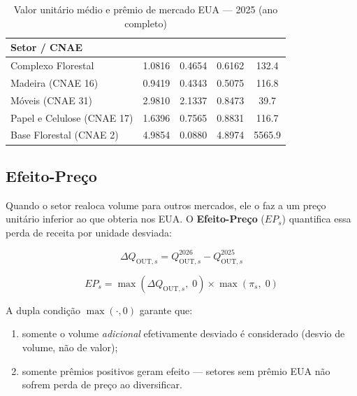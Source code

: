 \documentclass[12pt, a4paper]{article}
\begin{document}
\begin{table}[H]
  \centering
  \caption{Valor unitário médio e prêmio de mercado EUA — 2025 (ano completo)}
  \label{tab:vu}
  \renewcommand{\arraystretch}{1.3}
  \begin{tabular}{lS[table-format=1.4]S[table-format=1.4]S[table-format=1.4]S[table-format=4.1]}
    \toprule
    \textbf{Setor / CNAE}
      & \textbf{}
      & \textbf{}
      & \textbf{}
      & \textbf{} \\
    \midrule
    Complexo Florestal         & 1.0816 & 0.4654 & 0.6162 & 132.4 \\
    Madeira (CNAE 16)          & 0.9419 & 0.4343 & 0.5075 & 116.8 \\
    Móveis (CNAE 31)           & 2.9810 & 2.1337 & 0.8473 &  39.7 \\
    Papel e Celulose (CNAE 17) & 1.6396 & 0.7565 & 0.8831 & 116.7 \\
    Base Florestal (CNAE 2)    & 4.9854 & 0.0880 & 4.8974 & 5565.9 \\
    \bottomrule
  \end{tabular}
\end{table}

\subsection{Efeito-Preço}
\label{sec:efeito_preco}

Quando o setor realoca volume para outros mercados, ele o faz a um preço
unitário inferior ao que obteria nos EUA. O \textbf{Efeito-Preço} (\(EP_s\))
quantifica essa perda de receita por unidade desviada:

\begin{equation}
  \Delta Q_{\text{OUT},s} = Q_{\text{OUT},s}^{2026} - Q_{\text{OUT},s}^{2025}
  \label{eq:delta_kg}
\end{equation}

\begin{equation}
  \boxed{
    EP_s = \max\!\left(\Delta Q_{\text{OUT},s},\; 0\right)
            \times \max\!\left(\pi_s,\; 0\right)
  }
  \label{eq:ep}
\end{equation}

A dupla condição $\max(\cdot, 0)$ garante que:
\begin{enumerate}[noitemsep]
  \item somente o volume \emph{adicional} efetivamente desviado é considerado
        (desvio de volume, não de valor);
  \item somente prêmios positivos geram efeito — setores sem prêmio EUA
        não sofrem perda de preço ao diversificar.
\end{enumerate}
\end{document}
